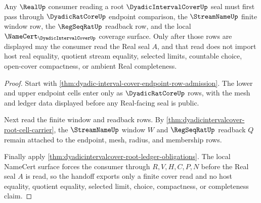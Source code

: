 \begin{theorem}
\label{thm:dyadicintervalcover-root-real-seal-handoff}
Any $\RealUp$ consumer reading a root $\DyadicIntervalCoverUp$ seal must first pass through $\DyadicRatCoreUp$ endpoint comparison, the $\StreamNameUp$ finite window row, the $\RegSeqRatUp$ readback row, and the local $\NameCert_{\DyadicIntervalCoverUp}$ coverage surface. Only after those rows are displayed may the consumer read the Real seal $A$, and that read does not import host real equality, quotient stream equality, selected limits, countable choice, open-cover compactness, or ambient Real completeness.
\end{theorem}
\begin{proof}
Start with \autoref{thm:dyadic-interval-cover-endpoint-row-admission}. The lower and upper endpoint cells enter only as $\DyadicRatCoreUp$ rows, with the mesh and ledger data displayed before any Real-facing seal is public.

Next read the finite window and readback rows. By \autoref{thm:dyadicintervalcover-root-cell-carrier}, the $\StreamNameUp$ window $W$ and $\RegSeqRatUp$ readback $Q$ remain attached to the endpoint, mesh, radius, and membership rows.

Finally apply \autoref{thm:dyadicintervalcover-root-ledger-obligations}. The local NameCert surface forces the consumer through $R,V,H,C,P,N$ before the Real seal $A$ is read, so the handoff exports only a finite cover read and no host equality, quotient equality, selected limit, choice, compactness, or completeness claim.
\end{proof}

